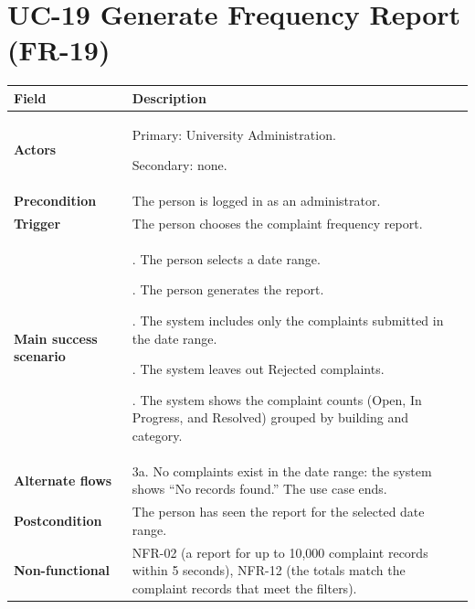 \documentclass[11pt,a4paper]{report}
\begin{document}
\section{UC-19 Generate Frequency Report (FR-19)}
\begin{longtable}{|>{\raggedright\arraybackslash}p{3.0cm}|>{\raggedright\arraybackslash}p{12.4cm}|}
\hline \textbf{Field} & \textbf{Description} \\ \hline \endhead
\textbf{Actors} & Primary: University Administration.\par\smallskip Secondary: none. \\ \hline
\textbf{Precondition} & The person is logged in as an administrator. \\ \hline
\textbf{Trigger} & The person chooses the complaint frequency report. \\ \hline
\textbf{Main success scenario} & 1. The person selects a date range.\par\smallskip 2. The person generates the report.\par\smallskip 3. The system includes only the complaints submitted in the date range.\par\smallskip 4. The system leaves out Rejected complaints.\par\smallskip 5. The system shows the complaint counts (Open, In Progress, and Resolved) grouped by building and category. \\ \hline
\textbf{Alternate flows} & 3a. No complaints exist in the date range: the system shows ``No records found.'' The use case ends. \\ \hline
\textbf{Postcondition} & The person has seen the report for the selected date range. \\ \hline
\textbf{Non-functional} & NFR-02 (a report for up to 10,000 complaint records within 5 seconds), NFR-12 (the totals match the complaint records that meet the filters). \\ \hline
\end{longtable}
\end{document}
